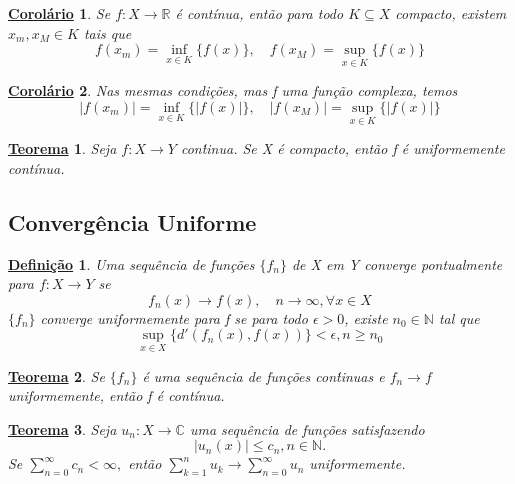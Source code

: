 \documentclass{article}
\newtheorem*{def*}{\underline{Defini\c c\~ao}}
\newtheorem*{theorem*}{\underline{Teorema}}
\newtheorem*{crl*}{\underline{Corol\'ario}}
\begin{document}
\begin{crl*}
  Se $f:X\rightarrow \mathbb{R}$ \'e cont\'inua, ent\~ao para todo $K \subseteq{X}$ compacto, existem $x _{m}, x _{M}\in{K}$
tais que 
  $$
  f(x _{m}) = \inf _{x\in{K}} \{f(x)\}, \quad f(x _{M}) = \sup _{x\in{K}} \{f(x)\}
  $$
\end{crl*}
\begin{crl*}
  Nas mesmas condi\c c\~oes, mas f uma fun\c c\~ao complexa, temos 
  $$
  |f(x _{m})| = \inf _{x\in{K}} \{|f(x)|\}, \quad |f(x _{M})| = \sup _{x\in{K}} \{|f(x)|\}
  $$
\end{crl*}
\begin{theorem*}
  Seja $f:X\rightarrow Y$ con\'tinua. Se X \'e compacto, ent\~ao f \'e uniformemente cont\'inua.
\end{theorem*}

\subsection{Converg\^encia Uniforme}
\begin{def*}
  Uma sequ\^encia de fun\c c\~oes $\{f_{n}\}$ de X em Y converge pontualmente para $f:X\rightarrow Y$ se 
  $$
  f_{n}(x)\to f(x), \quad n\to\infty, \forall{x\in{X}}
  $$
  $\{f_{n}\}$ converge uniformemente para f se para todo $\epsilon > 0$, existe $n_{0}\in \mathbb{N}$ tal que
  $$
  \sup _{x\in{X}} \{d'(f_{n}(x), f(x))\} < \epsilon, n\geq{n_{0}}
  $$  
\end{def*}
\begin{theorem*}
  Se $\{f_{n}\}$ \'e uma sequ\^encia de fun\c c\~oes con\'tinuas e $f_{n}\to{f}$ uniformemente, ent\~ao f \'e cont\'inua.
\end{theorem*}
\begin{theorem*}
  Seja $u_{n}:X\rightarrow \mathbb{C}$ uma sequ\^encia de fun\c c\~oes satisfazendo
  $$
  |u_{n}(x)|\leq c_{n}, n\in \mathbb{N}.
  $$
  Se $\sum\limits_{n=0}^{\infty}c_{n} < \infty,$ ent\~ao $\sum\limits_{k=1}^{n}u_{k}\to \sum\limits_{n=0}^{\infty}u_{n}$ uniformemente.
\end{theorem*}
\end{document}
